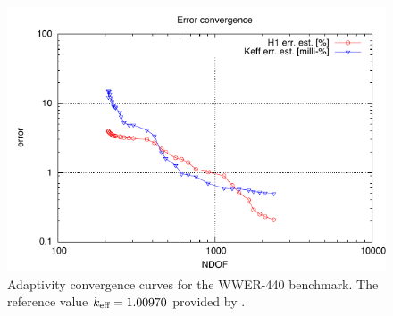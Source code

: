 \begin{figure}[!hb]
\centering
  \includegraphics[scale=.85]{vver440/conv_dof}
  \caption[Adaptivity convergence curves for the WWER-440 benchmark]{Adaptivity convergence curves for the WWER-440
  benchmark. The reference value $k_{\text{eff}} = 1.00970$ provided by \cite{Chao2}.}
  \label{fig:63}
\end{figure}

\clearpage
